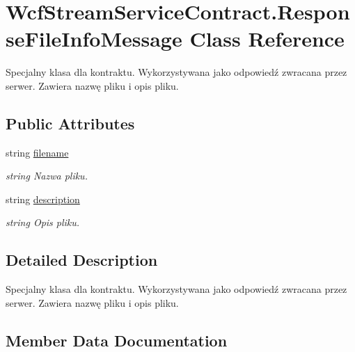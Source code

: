 \hypertarget{class_wcf_stream_service_contract_1_1_response_file_info_message}{}\section{Wcf\+Stream\+Service\+Contract.\+Response\+File\+Info\+Message Class Reference}
\label{class_wcf_stream_service_contract_1_1_response_file_info_message}


Specjalny klasa dla kontraktu. Wykorzystywana jako odpowiedź zwracana przez serwer. Zawiera nazwę pliku i opis pliku.  


\subsection*{Public Attributes}
\begin{DoxyCompactItemize}
\item 
string \hyperlink{class_wcf_stream_service_contract_1_1_response_file_info_message_aaf27aebcd1b3b4ed2491f9269d82d7b4}{filename}
\begin{DoxyCompactList}\small\item\em string Nazwa pliku. \end{DoxyCompactList}\item 
string \hyperlink{class_wcf_stream_service_contract_1_1_response_file_info_message_a49fbbc7177b5b8e5c5e68717b6c51db3}{description}
\begin{DoxyCompactList}\small\item\em string Opis pliku. \end{DoxyCompactList}\end{DoxyCompactItemize}


\subsection{Detailed Description}
Specjalny klasa dla kontraktu. Wykorzystywana jako odpowiedź zwracana przez serwer. Zawiera nazwę pliku i opis pliku. 



\subsection{Member Data Documentation}
\mbox{\label{class_wcf_stream_service_contract_1_1_response_file_info_message_a49fbbc7177b5b8e5c5e68717b6c51db3}} 
